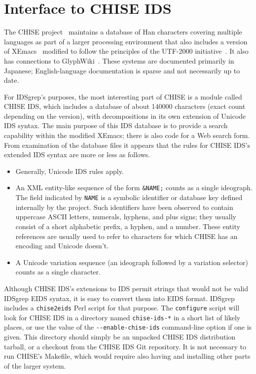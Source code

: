 \documentclass[twocolumn]{report}
\begin{document}

\section{Interface to CHISE IDS}

The CHISE project~\cite{CHISE} maintains a database of Han characters
covering multiple languages as part of a larger processing environment that
also includes a version of XEmacs~\cite{XEmacs} modified to follow the
principles of the UTF-2000 initiative~\cite{UTF2000}.  It also has
connections to GlyphWiki~\cite{GlyphWiki}. 
These systems are documented primarily in Japanese; English-language
documentation is sparse and not necessarily up to date.

For IDSgrep's purposes, the most interesting part of CHISE is a module
called CHISE IDS, which includes a database of about 140000 characters
(exact count depending on the version), with decompositions in its own
extension of Unicode IDS syntax.  The main purpose of this IDS database is
to provide a search capability within the modified XEmacs; there is also
code for a Web search form.  From examination of the database files it
appears that the rules for CHISE IDS's extended IDS syntax are more or less
as follows.

\begin{itemize}
\item Generally, Unicode IDS rules apply.
\item An XML entity-like sequence of the form \texttt{\&NAME;} counts as a
single ideograph.  The field indicated by \texttt{NAME} is a symbolic
identifier or database key defined internally by the project.  Such
identifiers have been observed to contain uppercase ASCII letters, numerals,
hyphens, and plus signs; they usually consist of a short alphabetic
prefix, a hyphen, and a number.  These entity references are usually used to
refer to characters for which CHISE has an encoding and Unicode doesn't.
\item A Unicode variation sequence (an ideograph followed by a variation
selector) counts as a single character.
\end{itemize}

Although CHISE IDS's extensions to IDS permit strings that would not be
valid IDSgrep EIDS syntax, it is easy to convert them into EIDS format. 
IDSgrep includes a \texttt{chise2eids} Perl script for that purpose.  The
\texttt{configure} script will look for CHISE IDS in a directory named
\texttt{chise-ids-*} in a short list of likely places, or use the value of
the \texttt{-{}-enable-chise-ids} command-line option if one is given.  This
directory should simply be an unpacked CHISE IDS distribution tarball, or a
checkout from the CHISE IDS Git repository.  It is not necessary to run
CHISE's Makefile, which would require also having and installing other parts
of the larger system.
\end{document}

